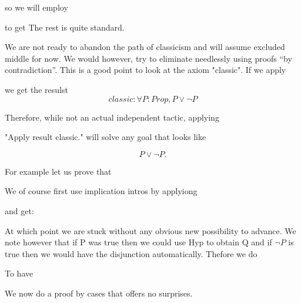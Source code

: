
so we will employ 

to get
 The rest is quite standard.

We are not ready to abandon the path of classicism and will assume excluded middle for now. We would however, try to eliminate needlessly using proofs ``by contradiction''.
This is a good point to look at the axiom "classic". If we apply

we get the resulst $$classic
    : \forall  P : Prop, P \lor \neg P$$


Therefore, while not an actual independent tactic, applying

"Apply result classic."
will solve any goal that looks like

$$P \lor \neg P.$$

For example let us prove that 

We of course first use implication intros by applyiong

and get:


At which point we are stuck without any obvious new possibility to advance. We note however that if P was true then we could use Hyp to obtain Q and if $\neg P$ is true then we would have the disjunction automatically. Thefore we do

 


To have



We now do a proof by cases that offers no surprises.





